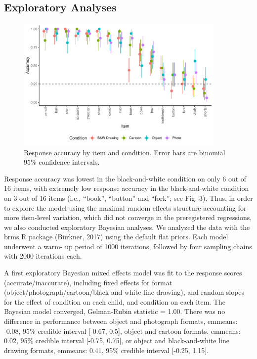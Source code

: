 \documentclass[10pt, letterpaper]{article}
\begin{document}
\subsection{Exploratory Analyses}\label{exploratory-analyses}

\begin{CodeChunk}
\begin{figure}[tb]

{\centering \includegraphics[width=4in]{figs/fig3-1} 

}

\caption[Response accuracy by item and condition]{Response accuracy by item and condition. Error bars are binomial 95\% confidence intervals.}\label{fig:fig3}
\end{figure}
\end{CodeChunk}

Response accuracy was lowest in the black-and-white condition on only 6
out of 16 items, with extremely low response accuracy in the
black-and-white condition on 3 out of 16 items (i.e., ``book'',
``button'' and ``fork''; see Fig. 3). Thus, in order to explore the
model using the maximal random effects structure accounting for more
item-level variation, which did not converge in the preregistered
regressions, we also conducted exploratory Bayesian analyses. We
analyzed the data with the brms R package (Bürkner, 2017) using the
default flat priors. Each model underwent a warm- up period of 1000
iterations, followed by four sampling chains with 2000 iterations each.

A first exploratory Bayesian mixed effects model was fit to the response
scores (accurate/inaccurate), including fixed effects for format
(object/photograph/cartoon/black-and-white line drawing), and random
slopes for the effect of condition on each child, and condition on each
item. The Bayesian model converged, Gelman-Rubin statistic = 1.00. There
was no difference in performance between object and photograph formats,
emmeans: -0.08, 95\% credible interval {[}-0.67, 0.5{]}, object and
cartoon formats. emmeans: 0.02, 95\% credible interval {[}-0.75,
0.75{]}, or object and black-and-white line drawing formats, emmeans:
0.41, 95\% credible interval {[}-0.25, 1.15{]}.
\end{document}
